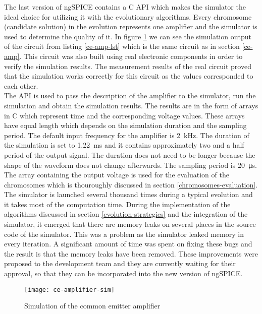 The last version of ngSPICE contains a C API which makes the simulator the ideal choice for utilizing it with the evolutionary algorithms. Every chromosome (candidate solution) in the evolution represents one amplifier and the simulator is used to determine the quality of it. In figure \ref{ce-amplifier-sim} we can see the simulation output of the circuit from listing \ref{ce-amp-lst} which is the same circuit as in section \ref{ce-amp}. This circuit was also built using real electronic components in order to verify the simulation results. The measurement results of the real circuit proved that the simulation works correctly for this circuit as the values corresponded to each other.\\
The API is used to pass the description of the amplifier to the simulator, run the simulation and obtain the simulation results. The results are in the form of arrays in C which represent time and the corresponding voltage values. These arrays have equal length which depends on the simulation duration and the sampling period. The default input frequency for the amplifier is \SI{2}{\kilo\hertz}. The duration of the simulation is set to \SI{1.22}{\milli\second} and it contains approximately two and a half period of the output signal. The duration does not need to be longer because the shape of the waveform does not change afterwards. The sampling period is \SI{20}{\micro\second}. The array containing the output voltage is used for the evaluation of the chromosomes which is thouroughly discussed in section \ref{chromosomes-evaluation}.\\
The simulator is launched several thousand times during a typical evolution and it takes most of the computation time. During the implementation of the algorithms discussed in section \ref{evolution-strategies} and the integration of the simulator, it emerged that there are memory leaks on several places in the source code of the simulator. This was a problem as the simulator leaked memory in every iteration. A significant amount of time was spent on fixing these bugs and the result is that the memory leaks have been removed. These improvements were proposed to the development team and they are currently waiting for their approval, so that they can be incorporated into the new version of ngSPICE.

\begin{figure}[H]
    \centering
    \texttt{[image: ce-amplifier-sim]}\label{ce-amplifier-sim}
    \caption{Simulation of the common emitter amplifier}
\end{figure}
